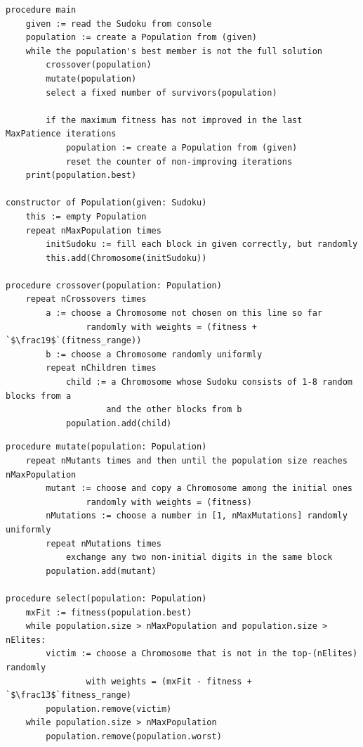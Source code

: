 \documentclass[10pt]{article}
\begin{document}
\begin{lstlisting}[language=pseu, style=lststyle]
procedure main
    given := read the Sudoku from console
    population := create a Population from (given)
    while the population's best member is not the full solution
        crossover(population)
        mutate(population)
        select a fixed number of survivors(population)

        if the maximum fitness has not improved in the last MaxPatience iterations
            population := create a Population from (given)
            reset the counter of non-improving iterations
    print(population.best)

constructor of Population(given: Sudoku)
    this := empty Population
    repeat nMaxPopulation times
        initSudoku := fill each block in given correctly, but randomly
        this.add(Chromosome(initSudoku))

procedure crossover(population: Population)
    repeat nCrossovers times
        a := choose a Chromosome not chosen on this line so far
                randomly with weights = (fitness + `$\frac19$`(fitness_range))
        b := choose a Chromosome randomly uniformly
        repeat nChildren times
            child := a Chromosome whose Sudoku consists of 1-8 random blocks from a
                    and the other blocks from b
            population.add(child)
\end{lstlisting}
\pagebreak
\begin{lstlisting}[language=pseu, style=lststyle, firstnumber=last]
procedure mutate(population: Population)
    repeat nMutants times and then until the population size reaches nMaxPopulation
        mutant := choose and copy a Chromosome among the initial ones
                randomly with weights = (fitness)
        nMutations := choose a number in [1, nMaxMutations] randomly uniformly
        repeat nMutations times
            exchange any two non-initial digits in the same block
        population.add(mutant)
    
procedure select(population: Population)
    mxFit := fitness(population.best)
    while population.size > nMaxPopulation and population.size > nElites:
        victim := choose a Chromosome that is not in the top-(nElites) randomly
                with weights = (mxFit - fitness + `$\frac13$`fitness_range)
        population.remove(victim)
    while population.size > nMaxPopulation
        population.remove(population.worst)
\end{lstlisting}
\end{document}
